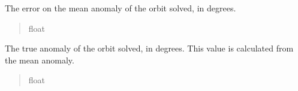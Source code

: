 \documentclass[letterpaper,11pt,english]{sphinxmanual}
\begin{document}
\begin{savenotes}
\begin{fulllineitems}
\begin{savenotes}
\begin{fulllineitems}
\begin{quote}
\begin{description}
\end{description}\end{quote}

\end{fulllineitems}\end{savenotes}


\begin{savenotes}\begin{fulllineitems}
\label{\detokenize{code/opihiexarata.orbit.solution:opihiexarata.orbit.solution.OrbitalSolution.mean_anomaly_error}}
\pysigstartsignatures
{}
\pysigstopsignatures
\sphinxAtStartPar
The error on the mean anomaly of the orbit solved, in degrees.
\begin{quote}\begin{description}
\sphinxAtStartPar
float

\end{description}\end{quote}

\end{fulllineitems}\end{savenotes}


\begin{savenotes}\begin{fulllineitems}
\label{\detokenize{code/opihiexarata.orbit.solution:opihiexarata.orbit.solution.OrbitalSolution.true_anomaly}}
\pysigstartsignatures
{}
\pysigstopsignatures
\sphinxAtStartPar
The true anomaly of the orbit solved, in degrees. This value is
calculated from the mean anomaly.
\begin{quote}\begin{description}
\sphinxAtStartPar
float

\end{description}\end{quote}

\end{fulllineitems}\end{savenotes}


\end{fulllineitems}
\end{savenotes}
\end{document}
